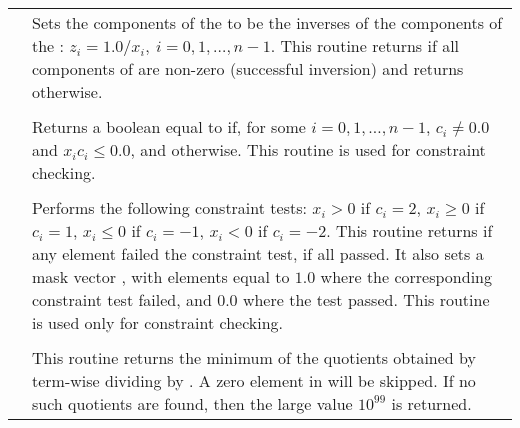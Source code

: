 \begin{supertabular}{|p{\colone}|p{\coltwo}|}
& Sets the components of the   to be the inverses
of the components of the  :
$z_i = 1.0 /  x_i  , \: i=0,1,\ldots,n-1$.
This routine returns  if all components of  are
non-zero (successful inversion) and returns  otherwise.  
\\
%
 &  \\
& Returns a boolean equal to  if, for some
$i=0,1,\ldots,n-1$, 
$c_i \ne 0.0$ and $x_i c_i \le 0.0$, and  otherwise.
This routine is used for constraint checking.
\\
%
 &  \\
& Performs the following constraint tests:
$x_i > 0$ if $c_i=2$,
$x_i \ge 0$ if $c_i=1$,
$x_i \le 0$ if $c_i=-1$,
$x_i < 0$ if $c_i=-2$.
This routine returns  if any element failed
the constraint test,  if all passed.  It also sets a
mask vector , with elements equal to $1.0$ where the
corresponding constraint test failed, and $0.0$
where the test passed.
This routine is used only for constraint checking.
\\
%
 &  \\
& This routine returns the minimum of the quotients obtained   
by term-wise dividing  by . 
A zero element in  will be skipped. 
If no such quotients are found, then the large value $10^{99}$ is returned. 
\\
%
\end{supertabular}
\bigskip
